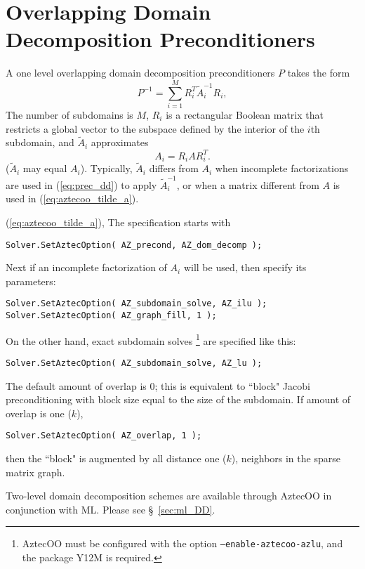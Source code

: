 \section{Overlapping Domain Decomposition Preconditioners}
\label{sec:aztecoo_dd}
A one level overlapping domain decomposition preconditioners $P$ takes the form
\begin{equation}
  \label{eq:prec_dd}
  P^{-1} = \sum_{i=1}^M R_i^T \tilde{A}_i^{-1} R_i,
\end{equation}
The number of subdomains is $M$, 
$R_i$ is a rectangular Boolean matrix that restricts
a global vector to the subspace defined by the interior of the $i$th
subdomain, and $\tilde{A}_i$ approximates
\begin{equation}
  \label{eq:aztecoo_tilde_a}
  A_i = R_i A R_i^T .
\end{equation}
($\tilde{A}_i$ may equal $A_i$). Typically, $\tilde{A}_i$ differs
from $A_i$ when incomplete factorizations are used in (\ref{eq:prec_dd})
to apply $\tilde{A}_i^{-1}$, or when a matrix different from $A$ is used
in (\ref{eq:aztecoo_tilde_a}).

(\ref{eq:aztecoo_tilde_a}),
The specification starts with
\begin{verbatim}
Solver.SetAztecOption( AZ_precond, AZ_dom_decomp );
\end{verbatim}
Next if an incomplete factorization of $A_i$ will be used, then specify its parameters:
\begin{verbatim}
Solver.SetAztecOption( AZ_subdomain_solve, AZ_ilu );
Solver.SetAztecOption( AZ_graph_fill, 1 );
\end{verbatim}
On the other hand, exact subdomain solves 
\footnote{AztecOO must be
  configured with the option {\tt --enable-aztecoo-azlu}, and the
  package Y12M is required.}
are specified like this:
\begin{verbatim}
Solver.SetAztecOption( AZ_subdomain_solve, AZ_lu );
\end{verbatim}

The default amount of overlap is $0$; this is equivalent to
``block" Jacobi preconditioning with block size equal to the size of the subdomain. 
If amount of overlap is one ($k$),
\begin{verbatim}
Solver.SetAztecOption( AZ_overlap, 1 );
\end{verbatim}
then the ``block" is augmented by all distance one ($k$),
neighbors in the sparse matrix graph.

\begin{remark} 
  Two-level domain decomposition schemes \cite{smbg:96}
are available through AztecOO in conjunction with ML.
Please see \S~\ref{sec:ml_DD}.
\end{remark}

